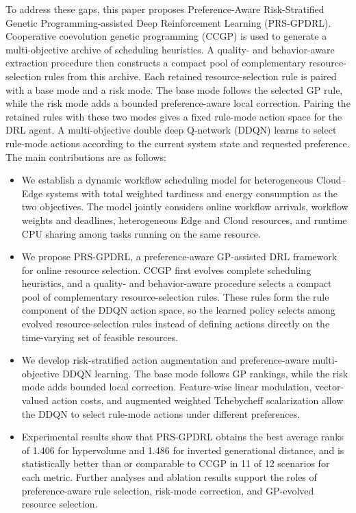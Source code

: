 \documentclass[10pt,journal]{IEEEtran}
\begin{document}
To address these gaps, this paper proposes Preference-Aware Risk-Stratified Genetic Programming-assisted Deep Reinforcement Learning (PRS-GPDRL). Cooperative coevolution genetic programming (CCGP) is used to generate a multi-objective archive of scheduling heuristics. A quality- and behavior-aware extraction procedure then constructs a compact pool of complementary resource-selection rules from this archive. Each retained resource-selection rule is paired with a base mode and a risk mode. The base mode follows the selected GP rule, while the risk mode adds a bounded preference-aware local correction. Pairing the retained rules with these two modes gives a fixed rule-mode action space for the DRL agent. A multi-objective double deep Q-network (DDQN) learns to select rule-mode actions according to the current system state and requested preference.
The main contributions are as follows:
\begin{itemize}
    \item We establish a dynamic workflow scheduling model for heterogeneous Cloud--Edge systems with total weighted tardiness and energy consumption as the two objectives. The model jointly considers online workflow arrivals, workflow weights and deadlines, heterogeneous Edge and Cloud resources, and runtime CPU sharing among tasks running on the same resource.

    \item We propose PRS-GPDRL, a preference-aware GP-assisted DRL framework for online resource selection. CCGP first evolves complete scheduling heuristics, and a quality- and behavior-aware procedure selects a compact pool of complementary resource-selection rules. These rules form the rule component of the DDQN action space, so the learned policy selects among evolved resource-selection rules instead of defining actions directly on the time-varying set of feasible resources.

    \item We develop risk-stratified action augmentation and preference-aware multi-objective DDQN learning. The base mode follows GP rankings, while the risk mode adds bounded local correction. Feature-wise linear modulation, vector-valued action costs, and augmented weighted Tchebycheff scalarization allow the DDQN to select rule-mode actions under different preferences.

    \item Experimental results show that PRS-GPDRL obtains the best average ranks of 1.406 for hypervolume and 1.486 for inverted generational distance, and is statistically better than or comparable to CCGP in 11 of 12 scenarios for each metric. Further analyses and ablation results support the roles of preference-aware rule selection, risk-mode correction, and GP-evolved resource selection.
\end{itemize}
\end{document}
